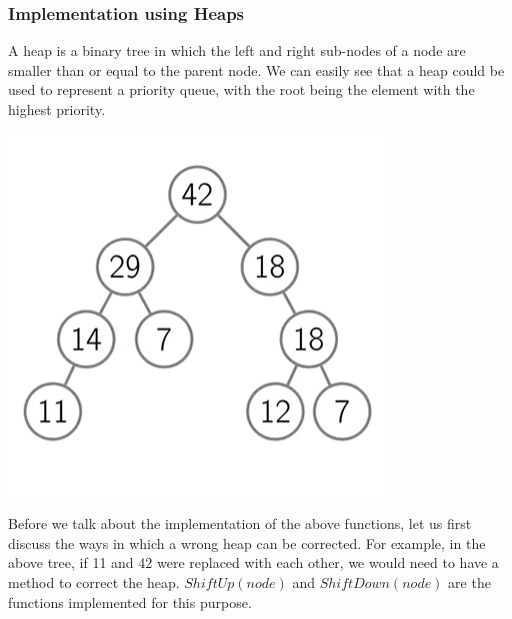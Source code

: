 \documentclass{article}
\theoremstyle{definition}
\theoremstyle{example}
\begin{document}
\subsubsection{\Large Implementation using Heaps}
\hspace{4mm} A heap is a binary tree in which the left and right sub-nodes of a node are smaller than or equal to the parent node. We can easily see that a heap could be used to represent a priority queue, with the root being the element with the highest priority.\par
\vspace{4mm}
\begin{center}
\includegraphics[]{tree.png}
\end{center}

Before we talk about the implementation of the above functions, let us first discuss the ways in which a wrong heap can be corrected. For example, in the above tree, if 11 and 42 were replaced with each other, we would need to have a method to correct the heap. $ShiftUp(node)$ and $ShiftDown(node)$ are the functions implemented for this purpose.\newpage
\end{document}

